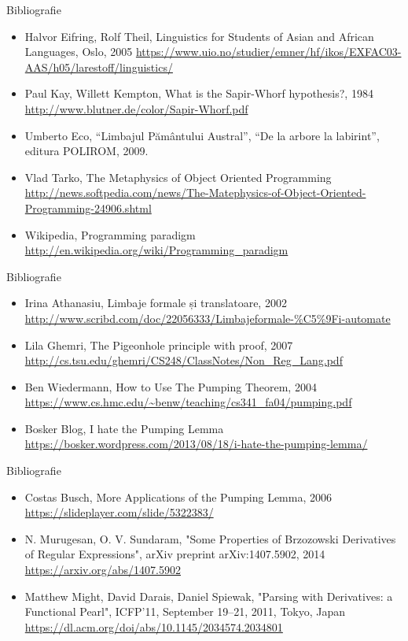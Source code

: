 \documentclass[pdf]{beamer}
\begin{document}
\begin{frame}{Bibliografie}
\begin{itemize}
\item
Halvor Eifring, Rolf Theil, Linguistics for Students of Asian and African Languages, Oslo, 2005
\url{https://www.uio.no/studier/emner/hf/ikos/EXFAC03-AAS/h05/larestoff/linguistics/}
\item
Paul Kay, Willett Kempton, What is the Sapir-Whorf hypothesis?, 1984
\url{http://www.blutner.de/color/Sapir-Whorf.pdf}
\item
Umberto Eco, “Limbajul Pământului Austral”, “De la arbore la labirint”, editura POLIROM, 2009.
\item
Vlad Tarko, The Metaphysics of Object Oriented Programming
\url{http://news.softpedia.com/news/The-Matephysics-of-Object-Oriented-Programming-24906.shtml}
\item
Wikipedia, Programming paradigm
\url{http://en.wikipedia.org/wiki/Programming\_paradigm}
\end{itemize}
\end{frame}


\begin{frame}{Bibliografie}
\begin{itemize}
\item
Irina Athanasiu, Limbaje formale și translatoare, 2002
\url{http://www.scribd.com/doc/22056333/Limbajeformale-\%C5\%9Fi-automate}
\item
Lila Ghemri, The Pigeonhole principle with proof, 2007
\url{http://cs.tsu.edu/ghemri/CS248/ClassNotes/Non_Reg_Lang.pdf}
\item
Ben Wiedermann, How to Use The Pumping Theorem, 2004
\url{https://www.cs.hmc.edu/~benw/teaching/cs341_fa04/pumping.pdf}
\item
Bosker Blog, I hate the Pumping Lemma
\url{https://bosker.wordpress.com/2013/08/18/i-hate-the-pumping-lemma/}
\end{itemize}
\end{frame}



\begin{frame}{Bibliografie}
\begin{itemize}
\item
Costas Busch, More Applications of the Pumping Lemma, 2006
\url{https://slideplayer.com/slide/5322383/}

\item
N. Murugesan, O. V. Sundaram, "Some Properties of Brzozowski Derivatives of Regular Expressions", arXiv preprint arXiv:1407.5902, 2014
\url{https://arxiv.org/abs/1407.5902}

\item
Matthew Might, David Darais, Daniel Spiewak, "Parsing with Derivatives: a Functional Pearl", ICFP’11, September 19–21, 2011, Tokyo, Japan
\url{https://dl.acm.org/doi/abs/10.1145/2034574.2034801}

\end{itemize}
\end{frame}
\end{document}
